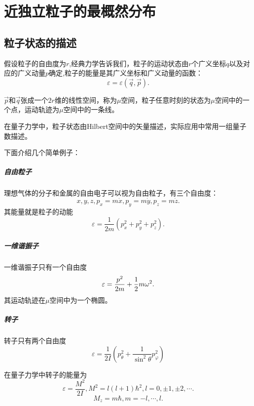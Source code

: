 \chapter{近独立粒子的最概然分布}
\section{粒子状态的描述}
假设粒子的自由度为$r$,经典力学告诉我们，粒子的运动状态由$r$个广义坐标$q$以及对应的广义动量$p$确定,粒子的能量是其广义坐标和广义动量的函数：
\begin{equation}
    \varepsilon=\varepsilon(\vec{q},\vec{p}).
\end{equation}

$\vec{p}$和$\vec{q}$张成一个$2r$维的线性空间，称为$\mu$空间，粒子任意时刻的状态为$\mu$空间中的一个点，运动轨迹为$\mu$空间中的一条线。

在量子力学中，粒子状态由Hilbert空间中的矢量描述，实际应用中常用一组量子数描述。

下面介绍几个简单例子：

\paragraph{自由粒子}理想气体的分子和金属的自由电子可以视为自由粒子，有三个自由度：
\begin{equation}
    x,y,z,p_x=m\dot{x},p_y=m\dot{y},p_z=m\dot{z}.
\end{equation}
其能量就是粒子的动能
\begin{equation}
    \varepsilon=\frac{1}{2m}\left(p_x^2+p_y^2+p_z^2\right).
\end{equation}

\paragraph{一维谐振子} 一维谐振子只有一个自由度
\begin{equation}
    \varepsilon=\frac{p^2}{2m}+\frac{1}{2} m\omega^2.
\end{equation}
其运动轨迹在$\mu$空间中为一个椭圆。

\paragraph{转子} 转子只有两个自由度
\begin{equation}
    \varepsilon=\frac{1}{2I}\left(p_\theta^2+\frac{1}{\sin^2\theta}p_\varphi^2\right)
\end{equation}

在量子力学中转子的能量为
\begin{equation}
    \varepsilon=\frac{M^2}{2I}, M^2=l(l+1)\hbar^2, l=0,\pm1, \pm2, \cdots.
\end{equation}
\begin{equation}
    M_z=m\hbar, m=-l,\cdots,l.
\end{equation}


